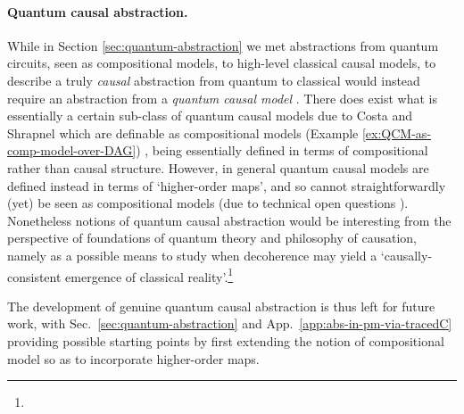 \documentclass{article}
\begin{document}
{\paragraph{Quantum causal abstraction.} 
While in Section \ref{sec:quantum-abstraction} we met abstractions from quantum circuits, seen as compositional models, to high-level classical causal models, to describe a truly \emph{causal} abstraction from quantum to classical would instead require an abstraction from a \emph{quantum causal model} \cite{barrett2019quantum, allen2017quantum}. 
There does exist what is essentially a certain sub-class of quantum causal models due to Costa and Shrapnel which are definable as compositional models (Example \ref{ex:QCM-as-comp-model-over-DAG}) \cite{costa2016quantum, giarmatzi2019quantum}, being essentially defined in terms of compositional rather than causal structure. However, in general quantum causal models are defined instead in terms of `higher-order maps', and so cannot straightforwardly (yet) be seen as compositional models (due to technical open questions \cite{vdLEtAL_2025_UnitaryCausalDecompositions,lorenz2021causal}). Nonetheless notions of quantum causal abstraction would be interesting from the perspective of foundations of quantum theory and philosophy of causation, namely as a possible means to study when decoherence may yield a `causally-consistent emergence of classical reality'.\footnote{} 


The development of genuine quantum causal abstraction is thus left for future work, with Sec.~\ref{sec:quantum-abstraction} and App.~\ref{app:abs-in-pm-via-tracedC} providing possible starting points by first extending the notion of compositional model so as to incorporate higher-order maps. 



}
\end{document}
